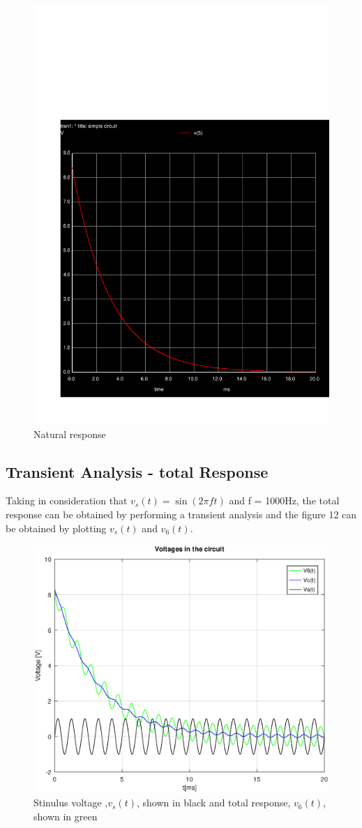 \begin{figure}[!h] \centering
\includegraphics[width=0.6\linewidth]{trans.pdf}
\caption{Natural response}
\label{fig:rc1}
\end{figure}


\subsection{Transient Analysis - total Response}

Taking in consideration that $v_s(t) = \sin(2\pi ft)$ and f = 1000Hz, the total response can be obtained by performing a transient analysis and the figure 12 can be obtained by plotting $v_s(t)$ and $v_6(t)$. 

\begin{figure}[!h] \centering
\includegraphics[width=0.6\linewidth]{global_voltage.eps}
\caption{Stinulus voltage ,$v_s(t)$, shown in black and total response, $v_6(t)$, shown in green}
\label{fig:rc1}
\end{figure}


